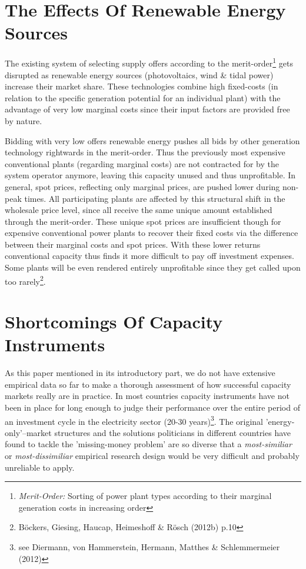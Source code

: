 \documentclass[11pt,a4paper,english]{scrreprt}
\begin{document}
\chapter{The Effects Of Renewable Energy Sources}

The existing system of selecting supply offers according to the 
merit-order\footnote{\emph{Merit-Order:} Sorting of power plant types according
to their marginal generation costs in increasing order} gets disrupted as
renewable energy sources (photovoltaics, wind \& tidal power) increase their
market share. These technologies combine high fixed-costs (in relation to the
specific generation potential for an individual plant) with the advantage of
very low marginal costs since their input factors are provided free by
nature.\par

Bidding with very low offers renewable energy pushes all bids by other generation
technology rightwards in the merit-order. Thus the previously most expensive
conventional plants (regarding marginal costs) are not contracted for by the
system operator anymore, leaving this capacity unused and thus unprofitable. In
general, spot prices, reflecting only marginal prices, are pushed lower during
non-peak times. All participating plants are affected by this structural shift
in the wholesale price level, since all receive the same unique amount
established through the merit-order. These unique spot prices are insufficient
though for expensive conventional power plants to recover their fixed costs via
the difference between their marginal costs and spot prices. With these lower
returns conventional capacity thus finds it more difficult to pay off investment
expenses. Some plants will be even rendered entirely unprofitable since they get
called upon too rarely\footnote{B\"{o}ckers, Giesing, Haucap, Heimeshoff \&
R\"{o}sch (2012b) p.10}.

 

 
\chapter{Shortcomings Of Capacity Instruments}



As this paper mentioned in its introductory part, we do not have extensive
empirical data so far to make a thorough assessment of how successful capacity
markets really are in practice. In most countries capacity instruments have not
been in place for long enough to judge their performance over the entire period
of an investment cycle in the electricity sector (20-30 years)\footnote{see
Diermann, von Hammerstein, Hermann, Matthes \& Schlemmermeier (2012)}. The
original 'energy-only'--market structures and the solutions politicians in
different countries have found to tackle the 'missing-money problem' are so
diverse that a \textsl{most-similiar} or \textsl{most-dissimiliar} empirical
research design would be very difficult and probably unreliable to apply.\par
\end{document}
